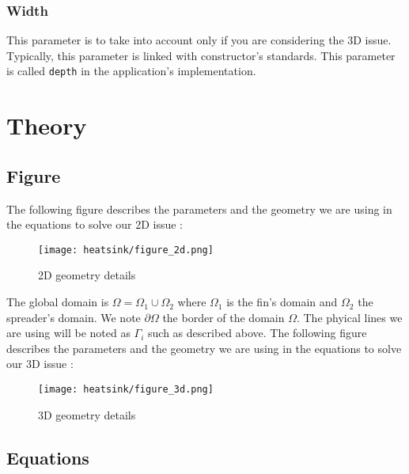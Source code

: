 \subsubsection{Width}

This parameter is to take into account only if you are considering the 3D issue. Typically, this parameter is linked with constructor's standards. This parameter is called \lstinline!depth! in the application's implementation.

\section{Theory}
\label{therm:equations}

\subsection{Figure}
The following figure describes the parameters and the geometry we are using in the equations to solve our 2D issue :
\begin{figure}[!h]
\centering
\texttt{[image: heatsink/figure\_2d.png]}
\caption{2D geometry details}
\end{figure}

The global domain is $\varOmega = \varOmega_1 \cup \varOmega_2 $ where $\varOmega_1$ is the fin's domain and $\varOmega_2$ the spreader's domain. We note $\partial\varOmega$ the border of the domain $\varOmega$. The phyical lines we are using will be noted as $\Gamma_i$ such as described above. The following figure describes the parameters and the geometry we are using in the equations to solve our 3D issue :
\begin{figure}[!h]
\centering
\texttt{[image: heatsink/figure\_3d.png]}
\caption{3D geometry details}
\end{figure}
\clearpage

\subsection{Equations}


